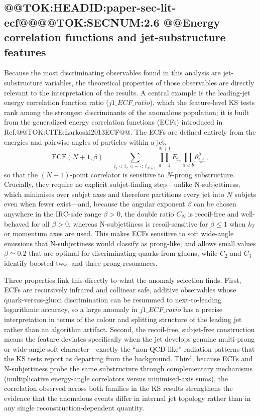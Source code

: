 \documentclass[11pt]{article}
\begin{document}
\subsection{@@TOK:HEADID:paper-sec-lit-ecf@@@@TOK:SECNUM:2.6 @@Energy correlation functions and jet-substructure features}

Because the most discriminating observables found in this analysis are jet-substructure variables, the theoretical properties of those observables are directly relevant to the interpretation of the results. A central example is the leading-jet energy correlation function ratio ($j1\_ECF\_ratio$), which the feature-level KS tests rank among the strongest discriminants of the anomalous population; it is built from the generalized energy correlation functions (ECFs) introduced in Ref.@@TOK:CITE:Larkoski2013ECF@@. The ECFs are defined entirely from the energies and pairwise angles of particles within a jet,
\begin{equation*}
\mathrm{ECF}(N+1,\beta)=\sum_{i_1<i_2<\cdots<i_{N+1}}\prod_{a=1}^{N+1} E_{i_a}\prod_{a<b}\theta_{i_a i_b}^{\beta},
\end{equation*}
so that the $(N{+}1)$-point correlator is sensitive to $N$-prong substructure. Crucially, they require no explicit subjet-finding step---unlike N-subjettiness, which minimises over subjet axes and therefore partitions every jet into $N$ subjets even when fewer exist---and, because the angular exponent $\beta$ can be chosen anywhere in the IRC-safe range $\beta>0$, the double ratio $C_N$ is recoil-free and well-behaved for all $\beta>0$, whereas N-subjettiness is recoil-sensitive for $\beta\le 1$ when $k_T$ or momentum axes are used. This makes ECFs sensitive to soft wide-angle emissions that N-subjettiness would classify as prong-like, and allows small values $\beta\simeq 0.2$ that are optimal for discriminating quarks from gluons, while $C_2$ and $C_3$ identify boosted two- and three-prong resonances.

Three properties link this directly to what the anomaly selection finds. First, ECFs are recursively infrared and collinear safe, additive observables whose quark-versus-gluon discrimination can be resummed to next-to-leading logarithmic accuracy, so a large anomaly in $j1\_ECF\_ratio$ has a precise interpretation in terms of the colour and splitting structure of the leading jet rather than an algorithm artifact. Second, the recoil-free, subjet-free construction means the feature deviates specifically when the jet develops genuine multi-prong or wide-angle-soft character---exactly the ``non-QCD-like'' radiation patterns that the KS tests report as departing from the background. Third, because ECFs and N-subjettiness probe the same substructure through complementary mechanisms (multiplicative energy-angle correlators versus minimised-axis sums), the correlation observed across both families in the KS results strengthens the evidence that the anomalous events differ in internal jet topology rather than in any single reconstruction-dependent quantity.
\end{document}
